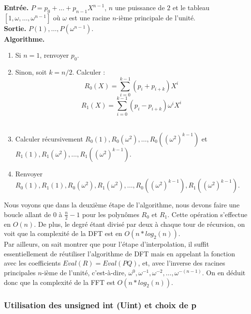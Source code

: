 \documentclass[12pt, a4paper]{article}
\begin{document}
\begin{tcolorbox}[colback=cyan!5!white,
                  colframe=cyan!100!black,
                  title=\textbf{Algorithme DFT}
                 ]
\textbf{Entrée.} $P = p_0+\dots+p_{n-1}X^{n-1}$, $n$ une puissance de $2$ et le tableau $[1, \omega,\dots,\omega^{n-1}]$ où $\omega$ est une racine $n$-ième principale de l'unité.\\
\textbf{Sortie.} $P(1),\dots,P(\omega^{n-1})$.\\
\textbf{Algorithme.}
\begin{enumerate}[itemsep=-2ex]
\item\textit{}Si $n=1$, renvoyer $p_0$. \\
\item\textit{}Sinon, soit $k=n/2$. Calculer : \\
\[ R_0(X) = \sum_{i=0}^{k-1}(p_i+p_{i+k})X^i \]
\[ R_1(X) = \sum_{i=0}^{k-1}(p_i-p_{i+k})\omega^iX^i \] \\
\item\textit{}Calculer récursivement $R_0(1), R_0(\omega^2),\dots,R_0((\omega^2)^{k-1})$ et \\ $R_1(1), R_1(\omega^2),\dots,R_1((\omega^2)^{k-1})$. \\
\item\textit{}Renvoyer $R_0(1), R_1(1), R_0(\omega^2), R_1(\omega^2),\dots, R_0((\omega^2)^{k-1}), R_1((\omega^2)^{k-1})$.
\end{enumerate}
\end{tcolorbox}

Nous voyons que dans la deuxième étape de l'algorithme, nous devons faire une boucle allant de 0 à $\frac{n}{2}-1$ pour les polynômes $R_0$ et $R_1$. Cette opération s'effectue en $O(n)$. De plus, le degré étant divisé par deux à chaque tour de récursion, on voit que la complexité de la DFT est en $O(n*log_2(n))$. \\
\indent Par ailleurs, on sait montrer que pour l'étape d'interpolation, il suffit essentiellement de réutiliser l'algorithme de DFT mais en appelant la fonction avec les coefficients $Eval(R)=Eval(PQ)$, et, avec l'inverse des racines principales $n$-ième de l'unité, c'est-à-dire, $\omega^{0},\omega^{-1},\omega^{-2},\dots,\omega^{-(n-1)}$.
On en déduit donc que la complexité de la FFT est $O(n*log_2(n))$.

\subsubsection{Utilisation des unsigned int (Uint) et choix de p}
\end{document}
